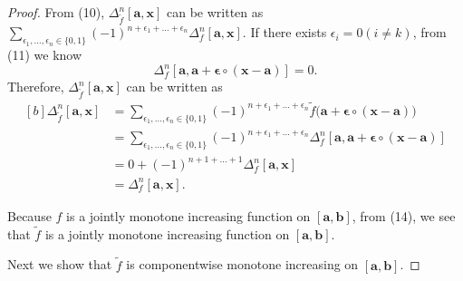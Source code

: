 \documentclass[10pt,a4paper]{amsart}
\begin{document}
\begin{proof}
    From (10), \(\Delta_{\widetilde{f}}^n[\boldsymbol{a},\boldsymbol{x}]\) can be written as\(\sum\limits_{\epsilon_1,\dots,\epsilon_n\in\{0,1\}}(-1)^{n+\epsilon_1+\dots+\epsilon_n}
            \Delta_f^n[\boldsymbol{a},\boldsymbol{x}]\).
    If there exists \(\epsilon_i=0 (i\neq k)\), from (11) we know
    \[\Delta_f^n[\boldsymbol{a},\boldsymbol{a}+\boldsymbol{\epsilon}\circ(\boldsymbol{x}-\boldsymbol{a})]=0.\]
    Therefore, \(\Delta_{\widetilde{f}}^n[\boldsymbol{a},\boldsymbol{x}]\) can be written as
        \begin{equation}
        \begin{aligned}[b]
            \Delta_{\widetilde{f}}^n[\boldsymbol{a},\boldsymbol{x}]&=
            \sum_{\epsilon_1,\dots,\epsilon_n\in\{0,1\}}(-1)^{n+\epsilon_1+\dots+\epsilon_n}
            \widetilde{f}\big(\boldsymbol{a}+\boldsymbol{\epsilon}\circ(\boldsymbol{x}-\boldsymbol{a})\big)\\
            &=\sum_{\epsilon_1,\dots,\epsilon_n\in\{0,1\}}(-1)^{n+\epsilon_1+\dots+\epsilon_n}
            \Delta_f^n[\boldsymbol{a},\boldsymbol{a}+\boldsymbol{\epsilon}\circ(\boldsymbol{x}-\boldsymbol{a})]\\
            &=0+(-1)^{n+1+\dots+1}\Delta_f^n[\boldsymbol{a},\boldsymbol{x}]\\
            &=\Delta_f^n[\boldsymbol{a},\boldsymbol{x}].
        \end{aligned}
    \end{equation}
    
    Because \(f\) is a jointly monotone increasing function on \([\boldsymbol{a},
    \boldsymbol{b}]\), from (14), we see that \(\widetilde{f}\) is a jointly monotone increasing function on \([\boldsymbol{a},
    \boldsymbol{b}]\).
    
    Next we show that \(\widetilde{f}\) is componentwise monotone increasing on \([\boldsymbol{a},
    \boldsymbol{b}]\). 
    

\end{proof}
\end{document}
